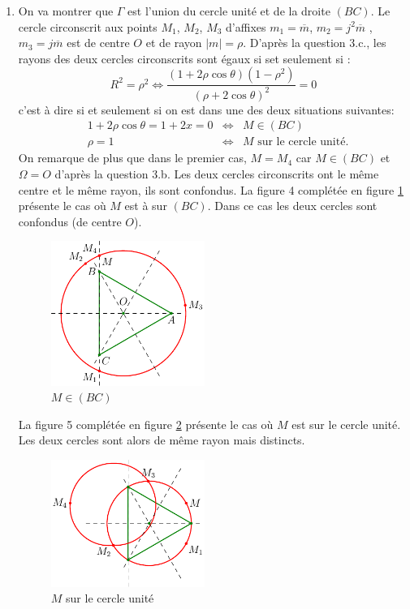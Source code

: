 \begin{enumerate}
\item On va montrer que $\Gamma$ est l'union du cercle unité et de la droite $(BC)$.\newline
Le cercle circonscrit aux points $M_1$, $M_2$, $M_3$ d'affixes $m_1 = \overline{m}$, $m_2 = j^2\overline{m}$ , $m_3 = j\overline{m}$ est de centre $O$ et de rayon $|m|=\rho$. D'après la question 3.c., les rayons des deux cercles circonscrits sont égaux si set seulement si :
\begin{displaymath}
 R^2 = \rho^2 \Leftrightarrow \frac{(1+2\rho\cos\theta)(1-\rho^2)}{(\rho+2\cos \theta)^2} = 0
\end{displaymath}
c'est à dire si et seulement si on est dans une des deux situations suivantes:
\[
\begin{aligned}
  &1+2\rho\cos\theta = 1+2x=0 &\Leftrightarrow& M \in (BC)\\
  &\rho =1 &\Leftrightarrow& M \text{ sur le cercle unité}.
\end{aligned}
\]
On remarque de plus que dans le premier cas, $M = M_4$ car $M \in (BC)$ et $\Omega= O$ d'après la question 3.b. Les deux cercles circonscrits ont le même centre et le même rayon, ils sont confondus.\newline
La figure 4 complétée en figure \ref{fig:Ccomp2_1} présente le cas où $M$ est à sur $(BC)$. Dans ce cas les deux cercles sont confondus (de centre $O$).
\begin{figure}
 \centering
\includegraphics[width=5cm]{Ccomp2_1.pdf}
\caption{$M\in (BC)$} \label{fig:Ccomp2_1}
\end{figure} \newline
La figure 5 complétée en figure \ref{fig:Ccomp2_2} présente le cas où $M$ est sur le cercle unité. Les deux cercles sont alors de même rayon mais distincts.
\begin{figure}
 \centering
\includegraphics[width=5cm]{Ccomp2_2.pdf}
\caption{$M$ sur le cercle unité} \label{fig:Ccomp2_2}
\end{figure}
\end{enumerate}
